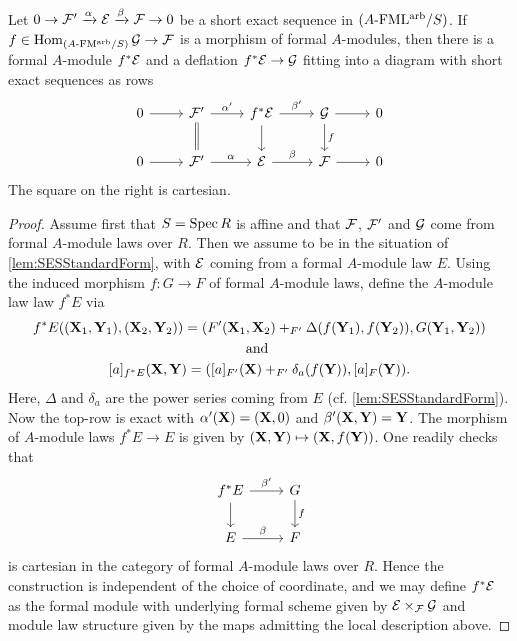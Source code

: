 \documentclass[../main.tex]{subfiles}
\begin{document}
\begin{lem}
  Let $0 \to \mathcal{F}' \xrightarrow{\alpha} \mathcal{E} \xrightarrow{\beta} \mathcal{F} \to 0$ be a short exact sequence in 
  ${({A}\textnormal-\allowbreak\mathrm{FML^{arb}}/{S})}$. If $f \in \operatorname{Hom}_{{({A}\textnormal-\allowbreak\mathrm{FM^{arb}}/{S})}} \mathcal{G} \to \mathcal{F}$ is a morphism 
  of formal $A$-modules, then there is a formal $A$-module $f^*\mathcal{E}$ 
  and a deflation $f^*\mathcal{E} \to \mathcal{G}$ fitting into a diagram with short exact 
  sequences as rows
  \begin{equation*}
    \begin{tikzcd}[ampersand replacement=\&]
	    0 \& {\cF'} \& {f^*\cE} \& \cG \& 0 \\
	    0 \& {\cF'} \& \cE \& \cF \& 0
	    \arrow[from=1-1, to=1-2]
	    \arrow["{\alpha'}", from=1-2, to=1-3]
	    \arrow[Rightarrow, no head, from=1-2, to=2-2]
	    \arrow["{\beta'}", from=1-3, to=1-4]
	    \arrow[from=1-3, to=2-3]
	    \arrow[from=1-4, to=1-5]
	    \arrow["f", from=1-4, to=2-4]
	    \arrow[from=2-1, to=2-2]
	    \arrow["\alpha", from=2-2, to=2-3]
	    \arrow["\beta", from=2-3, to=2-4]
	    \arrow[from=2-4, to=2-5]
    \end{tikzcd}
  \end{equation*}
  The square on the right is cartesian.
\begin{proof}
  Assume first that $S = \operatorname{Spec} R$ is affine and that $\mathcal{F}$, $\mathcal{F}'$ and $\mathcal{G}$ 
  come from formal $A$-module laws over $R$. Then we assume to be in the
  situation of \cref{lem:SESStandardForm}, with
  $\mathcal{E}$ coming from a formal $A$-module law $E$. Using the induced morphism 
  $f: G \to F$ of formal $A$-module laws, define the $A$-module law
  law $f^* E$ via
  \begin{gather*}
    f^*E((\mathbf{X}_1, \mathbf{Y}_1), (\mathbf{X}_2, \mathbf{Y}_2)) = (F'(\mathbf{X}_1, \mathbf{X}_2) +_{F'}
    \Delta(f(\mathbf{Y}_1), f(\mathbf{Y}_2)) , G(\mathbf{Y}_1, \mathbf{Y}_2)) \\
    \text{and } \\
    [a]_{f^*E}(\mathbf{X}, \mathbf{Y}) = ([a]_{F'}(\mathbf{X}) +_{F'} \delta_a(f(\mathbf{Y})), [a]_F(\mathbf{Y})).
  \end{gather*}
  Here, $\Delta$ and $\delta_a$ are the power series coming from $E$ (cf.
  \cref{lem:SESStandardForm}).
  Now the top-row is exact with $\alpha'(\mathbf{X}) = (\mathbf{X}, 0)$ and 
  $\beta'(\mathbf{X}, \mathbf{Y}) = \mathbf{Y}$. 
  The morphism of $A$-module laws $f^*E \to E$ is given by 
  $(\mathbf{X}, \mathbf{Y})\mapsto (\mathbf{X},f(\mathbf{Y}))$. One readily checks that 
  \begin{equation*}
    \begin{tikzcd}[ampersand replacement=\&]
    	{f^*E} \& G \\
    	E \& F
    	\arrow["{\beta'}", from=1-1, to=1-2]
    	\arrow[from=1-1, to=2-1]
    	\arrow["f", from=1-2, to=2-2]
    	\arrow["\beta", from=2-1, to=2-2]
    \end{tikzcd}
  \end{equation*}
  is cartesian in the category of formal $A$-module laws over $R$. 
  Hence the construction is independent of the choice of coordinate,
  and we may define $f^* \mathcal{E}$ as the formal module with underlying formal
  scheme given by $\mathcal{E} \times_{\mathcal{F}} \mathcal{G}$ and module law structure given by the
  maps admitting the local description above.
  \end{proof}
\end{lem}
\end{document}
